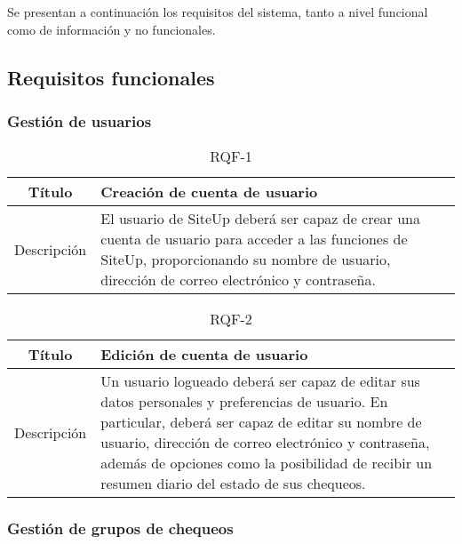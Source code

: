 Se presentan a continuación los requisitos del sistema, tanto a nivel funcional como de información y no funcionales.

\subsection{Requisitos funcionales}

\subsubsection{Gestión de usuarios}

\begin{table}[h!]
  \centering
  \begin{tabularx}{\textwidth}{|c|X|}
    \hline
    Título & Creación de cuenta de usuario \\

    \hline

    Descripción & El usuario de SiteUp deberá ser capaz de crear una cuenta de
    usuario para acceder a las funciones de SiteUp, proporcionando su nombre de
    usuario, dirección de correo electrónico y contraseña.\\

    \hline
  \end{tabularx}
  \caption{RQF-1}
\end{table}

\begin{table}[h!]
  \centering
  \begin{tabularx}{\textwidth}{|c|X|}
    \hline
    Título & Edición de cuenta de usuario \\

    \hline

    Descripción & Un usuario logueado deberá ser capaz de editar sus datos
    personales y preferencias de usuario. En particular, deberá ser capaz de
    editar su nombre de usuario, dirección de correo electrónico y contraseña,
    además de opciones como la posibilidad de recibir un resumen diario del
    estado de sus chequeos.\\

    \hline
  \end{tabularx}
  \caption{RQF-2}
\end{table}

\FloatBarrier
\subsubsection{Gestión de grupos de chequeos}

